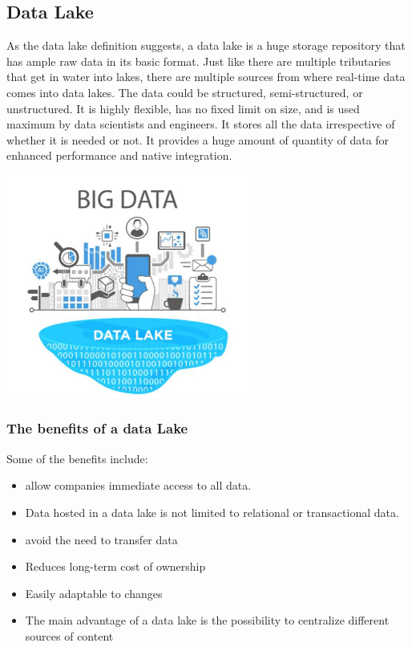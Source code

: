 \documentclass{article}
\begin{document}
\begin{multicols}{2}
\subsection{Data Lake}
As the data lake definition suggests, a data lake is a huge storage repository that has ample raw data in its basic format. Just like there are multiple tributaries that get in water into lakes, there are multiple sources from where real-time data comes into data lakes. The data could be structured, semi-structured, or unstructured. It is highly flexible, has no fixed limit on size, and is used maximum by data scientists and engineers. It stores all the data irrespective of whether it is needed or not. It provides a huge amount of quantity of data for enhanced performance and native integration.
\begin{center}
	\includegraphics[width=8cm]{./images/datalake.jpg} 
\end{center}
\subsubsection {The benefits of a data Lake}
Some of the benefits include:
\begin{itemize}
\item allow companies immediate access to all data.
\item Data hosted in a data lake is not limited to relational or transactional data.
\item avoid the need to transfer data
\item Reduces long-term cost of ownership
\item Easily adaptable to changes
\item The main advantage of a data lake is the possibility to centralize different sources of content
\end{itemize}


\end{multicols}
\end{document}
